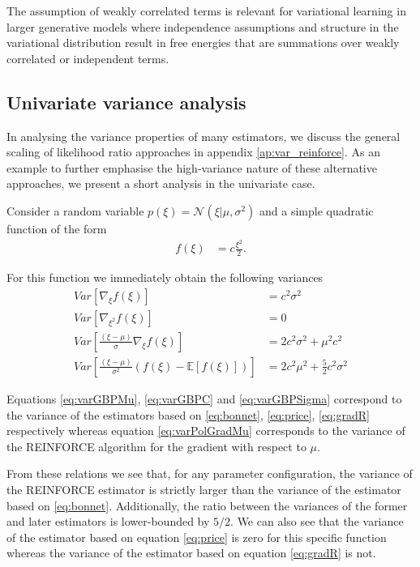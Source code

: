 \documentclass{article}
\newcommand{\E}{\mathbb{E}} %
\newcommand{\N}{\mathcal{N}} %
\begin{document}
\begin{bibunit}[icml2013]
The assumption of weakly correlated terms is relevant for 
 variational learning in larger generative models where independence assumptions and structure in 
the 
 variational distribution result in free energies that are summations 
 over weakly correlated or independent terms.%
 
\subsection{Univariate variance analysis}
\label{ap:Variance}
In analysing the variance properties of many estimators, we discuss the 
general scaling of likelihood ratio approaches in appendix 
\ref{ap:var_reinforce}. As an example to further emphasise the 
high-variance nature of these alternative approaches, we present a short 
analysis in the univariate case.

Consider a random variable $p(\xi) = \N(\xi| \mu, \sigma^2)$ and  a 
simple quadratic function of the form
\begin{align}
f(\xi) &=  c \frac{\xi^2}{2}. 
\end{align}

For this function we immediately obtain the following variances
\begin{align}
Var[ \nabla_{\xi} f(\xi) ] &= c^2 \sigma^2 \label{eq:varGBPMu} \\
Var[ \nabla_{\xi^2} f(\xi)  ] &= 0 \label{eq:varGBPC} \\
Var[ \frac{( \xi - \mu )}{ \sigma } \nabla_{\xi} f(\xi) ] &= 2 c^2 \sigma^2 + 
\mu^2 c^2 \label{eq:varGBPSigma} \\
Var[  \frac{( \xi - \mu )}{ \sigma^2 } ( f(\xi) - \E[ f(\xi)   ] ) ] &= 2 c^2 
\mu^2 + \frac{5}{2} c^2 \sigma^2 \label{eq:varPolGradMu}
\end{align}
 
 Equations \eqref{eq:varGBPMu}, \eqref{eq:varGBPC} and 
 \eqref{eq:varGBPSigma} correspond to the variance of the estimators based 
 on \eqref{eq:bonnet}, \eqref{eq:price}, \eqref{eq:gradR} respectively 
 whereas equation \eqref{eq:varPolGradMu} corresponds to the variance of 
 the REINFORCE algorithm for the gradient with respect to $\mu$.
 
 From these relations we see that, for any parameter configuration, the 
 variance of the REINFORCE estimator is strictly larger than the variance of 
 the estimator based on \eqref{eq:bonnet}. Additionally, the ratio between 
 the variances of the former and later estimators is lower-bounded by 
 $5/2$. We can also see that the variance of the estimator based on equation
 \eqref{eq:price} is zero for this specific function whereas the variance of 
 the estimator based on equation \eqref{eq:gradR} is not.
 

\end{bibunit}
\end{document}
